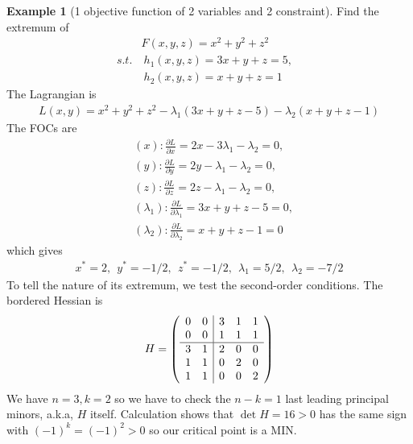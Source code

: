 \documentclass[11pt,a4paper]{book}
\theoremstyle{definition}\newtheorem{definition}{Definition}
\theoremstyle{definition}\newtheorem{fact}{Fact}
\theoremstyle{definition}\newtheorem{remark}{Remark}
\theoremstyle{definition}\newtheorem{ex}{Ex.}
\theoremstyle{definition}\newtheorem{project}{Project}
\theoremstyle{definition}\newtheorem{problem}{Problem}
\theoremstyle{definition}\newtheorem{example}{Example}
\numberwithin{theorem}{section}
\numberwithin{corollary}{chapter}
\numberwithin{assumption}{chapter}
\numberwithin{definition}{chapter}
\numberwithin{prop}{chapter}
\numberwithin{notation}{chapter}
\numberwithin{problem}{chapter}
\numberwithin{example}{chapter}
\numberwithin{fact}{chapter}
\numberwithin{ex}{chapter}
\begin{document}
		\begin{example}[1 objective function of 2 variables and 2 constraint]
		Find the extremum of
		\begin{align*}
			& F(x,y,z) = x^2 + y^2 + z^2     \\
			s.t. &\ h_1(x,y,z) = 3x + y + z = 5, &                                \\
			& \  h_2 (x,y,z) = x + y + z = 1 
		\end{align*}
		The Lagrangian is
		\begin{align*}
			L(x,y) = x^2 + y^2 + z^2 - \lambda_1 (3x + y + z - 5) - \lambda_2 (x + y +z - 1) 
		\end{align*}
		The FOCs are
		\begin{align*}
			& (x): \frac{\partial L}{\partial x} = 2x - 3 \lambda_1 - \lambda_2  = 0,  \\
			& (y): \frac{\partial L}{\partial y} = 2y - \lambda_1 - \lambda_2 = 0,     \\
			& (z): \frac{\partial L}{\partial z} = 2z - \lambda_1 - \lambda_2 = 0,     \\
			& (\lambda_1): \frac{\partial L}{\partial \lambda_1} = 3x + y + z - 5 = 0, \\
			& (\lambda_2): \frac{\partial L}{\partial \lambda_2} = x + y +z - 1 = 0    
		\end{align*}
		which gives
		\begin{align*}
			x^* = 2, \ \ y^* = - 1/2, \ \ z^* = -1/2, \ \ \lambda_1 = 5/2, \ \ \lambda_2 = -7/2 
		\end{align*}
		To tell the nature of its extremum, we test the second-order conditions. The bordered Hessian is
		\begin{align*}
			H = \left( \begin{array}{c | c}
				\begin{matrix}
					0 & 0 \\
					0 & 0 
				\end{matrix} & \begin{matrix}
					3 & 1 & 1 \\
					1 & 1 & 1 
				\end{matrix} \\
				\hline
				\begin{matrix}
					3 & 1  \\
					1 & 1  \\
					1 & 1 
				\end{matrix} & \begin{matrix}
					2 & 0 & 0 \\
					0 & 2 & 0 \\
					0 & 0 & 2 
				\end{matrix}
			\end{array} \right)
		\end{align*}
		We have $n=3, k=2$ so we have to check the $n-k=1$ last leading principal minors, a.k.a, $H$ itself. Calculation shows that $\det H = 16 > 0$ has the same sign with $(-1)^k = (-1)^2 > 0$ so our critical point is a MIN. 
	\end{example}
	
\end{document}

